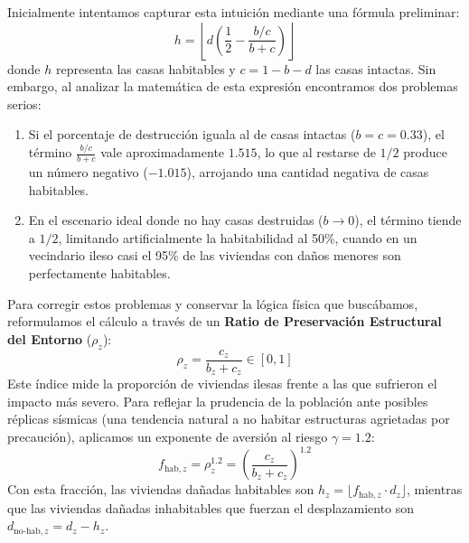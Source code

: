 \documentclass[10pt,letterpaper]{article}
\begin{document}
Inicialmente intentamos capturar esta intuición mediante una fórmula preliminar:
\begin{equation*}
    h = \left\lfloor d \left(\frac{1}{2} - \frac{b/c}{b+c}\right) \right\rfloor
\end{equation*}
donde $h$ representa las casas habitables y $c = 1 - b - d$ las casas intactas. Sin embargo, al analizar la matemática de esta expresión encontramos dos problemas serios:
\begin{enumerate}
    \item Si el porcentaje de destrucción iguala al de casas intactas ($b = c = 0.33$), el término $\frac{b/c}{b+c}$ vale aproximadamente $1.515$, lo que al restarse de $1/2$ produce un número negativo ($-1.015$), arrojando una cantidad negativa de casas habitables.
    \item En el escenario ideal donde no hay casas destruidas ($b \to 0$), el término tiende a $1/2$, limitando artificialmente la habitabilidad al 50\%, cuando en un vecindario ileso casi el 95\% de las viviendas con daños menores son perfectamente habitables.
\end{enumerate}

Para corregir estos problemas y conservar la lógica física que buscábamos, reformulamos el cálculo a través de un \textbf{Ratio de Preservación Estructural del Entorno} ($\rho_z$):
\begin{equation}
    \rho_z = \frac{c_z}{b_z + c_z} \in [0, 1]
\end{equation}
Este índice mide la proporción de viviendas ilesas frente a las que sufrieron el impacto más severo. Para reflejar la prudencia de la población ante posibles réplicas sísmicas (una tendencia natural a no habitar estructuras agrietadas por precaución), aplicamos un exponente de aversión al riesgo $\gamma = 1.2$:
\begin{equation}
    f_{\text{hab}, z} = \rho_z^{1.2} = \left(\frac{c_z}{b_z + c_z}\right)^{1.2}
\end{equation}
Con esta fracción, las viviendas dañadas habitables son $h_z = \lfloor f_{\text{hab}, z} \cdot d_z \rfloor$, mientras que las viviendas dañadas inhabitables que fuerzan el desplazamiento son $d_{\text{no-hab}, z} = d_z - h_z$.
\end{document}
